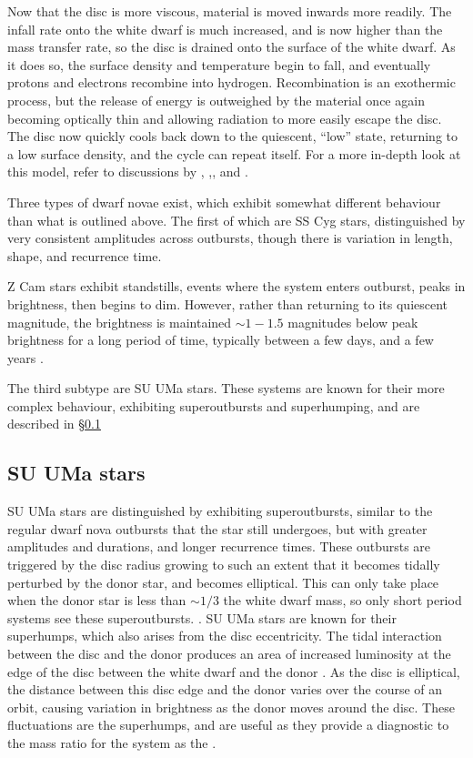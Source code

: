 Now that the disc is more viscous, material is moved inwards more readily. The infall rate onto the white dwarf is much increased, and is now higher than the mass transfer rate, so the disc is drained onto the surface of the white dwarf. As it does so, the surface density and temperature begin to fall, and eventually protons and electrons recombine into hydrogen. Recombination is an exothermic process, but the release of energy is outweighed by the material once again becoming optically thin and allowing radiation to more easily escape the disc. The disc now quickly cools back down to the quiescent, ``low'' state, returning to a low surface density, and the cycle can repeat itself. For a more in-depth look at this model, refer to discussions by \citet{cannizzo1993}, \citet{osaki1996},, and \citet{Hameury2002}.

Three types of dwarf novae exist, which exhibit somewhat different behaviour than what is outlined above. The first of which are SS Cyg stars, distinguished by very consistent amplitudes across outbursts, though there is variation in length, shape, and recurrence time.

Z Cam stars exhibit standstills, events where the system enters outburst, peaks in brightness, then begins to dim. However, rather than returning to its quiescent magnitude, the brightness is maintained $\sim 1-1.5$ magnitudes below peak brightness for a long period of time, typically between a few days, and a few years \citep{simonsen2014}.

The third subtype are SU UMa stars. These systems are known for their more complex behaviour, exhibiting superoutbursts and superhumping, and are described in \S\ref{sect:introduction:SU UMa}

\subsection{SU UMa stars}
\label{sect:introduction:SU UMa}

SU UMa stars are distinguished by exhibiting superoutbursts, similar to the regular dwarf nova outbursts that the star still undergoes, but with greater amplitudes and durations, and longer recurrence times. These outbursts are triggered by the disc radius growing to such an extent that it becomes tidally perturbed by the donor star, and becomes elliptical. This can only take place when the donor star is less than $\sim 1/3$ the white dwarf mass, so only short period systems see these superoutbursts. \citep{hellier2001}. 
SU UMa stars are known for their superhumps, which also arises from the disc eccentricity. The tidal interaction between the disc and the donor produces an area of increased luminosity at the edge of the disc between the white dwarf and the donor \citep{warner1988}. As the disc is elliptical, the distance between this disc edge and the donor varies over the course of an orbit, causing variation in brightness as the donor moves around the disc.
These fluctuations are the superhumps, and are useful as they provide a diagnostic to the mass ratio for the system as the  \citep{Patterson1998, Patterson2001, patterson2005}. 

